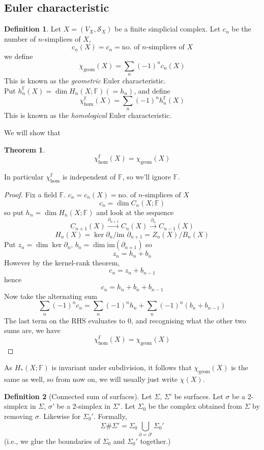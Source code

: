 \documentclass[a4paper,14pt]{extarticle}
\theoremstyle{definition}
\newtheorem*{theorem}{Theorem}
\newtheorem*{definition}{Definition}
\begin{document}
\subsection{{Euler characteristic}}
\begin{definition}
	Let $X=(V_X,\mathcal{S}_X)$ be a finite simplicial complex. Let $c_n$ be the number of
	$n$-simplices of $X$, \[c_n(X)=c_n=\text{no. of $n$-simplices of $X$}\] we define
	\[\chi_\text{geom}(X)=\sum_{n}(-1)^n c_n(X)\]
	This is known as the \emph{geometric} Euler characteristic. \\

	Put $h_n^\mathbb{F}(X) = \dim H_n(X;\mathbb{F}) (=h_n)$, and define
	\[\chi_\text{hom}^\mathbb{F}(X)=\sum_n (-1)^n h_n^\mathbb{F}(X)\]
	This is known as the \emph{homological} Euler characteristic.
\end{definition}

We will show that 
\begin{theorem}
	\[\chi_\text{hom}^\mathbb{F}(X)=\chi_\text{geom}(X)\]
\end{theorem}
In particular $\chi_\text{hom}^\mathbb{F}$ is independent of $\mathbb{F}$, so we'll ignore
$\mathbb{F}$.

\begin{proof}
	Fix a field $\mathbb{F}$. $c_n=c_n(X)=\text{no. of $n$-simplices of $X$}$
	\[c_n=\dim C_n(X;\mathbb{F})\] so put $h_n=\dim H_n(X;\mathbb{F})$ and look at the 
	sequence
	\[C_{n+1}(X)\xrightarrow{\partial_{n+1}}C_n(X)\xrightarrow{\partial_n}C_{n-1}(X)\]
	\[H_n(X)=\ker\partial_n/\text{im }\partial_{n+1}=Z_n(X)/B_n(X)\]
	Put $z_n=\dim\ker\partial_n, \,b_n=\dim\text{im}(\partial_{n+1})$ so 
	\[z_n=h_n+b_n\] However by the kernel-rank theorem,
	\[c_n=z_n+b_{n-1}\] hence \[c_n=h_n+b_n+b_{n-1}\]
	Now take the alternating sum 
	\[\sum_{n} (-1)^n c_n=\sum_n (-1)^n h_n +\sum_n (-1)^n (b_n+b_{n-1})\]
	The last term on the RHS evaluates to 0, and recognising what the other two sums are, we
	have \[\chi_\text{hom}^\mathbb{F}(X)=\chi_\text{geom}(X)\]
\end{proof}

As $H_*(X;\mathbb{F})$ is invariant under subdivision, it follows that $\chi_\text{geom}(X)$
is the same as well, so from now on, we will usually just write $\chi(X)$.

\begin{definition}[Connected sum of surfaces]
	Let $\Sigma, \,\Sigma'$ be surfaces. Let $\sigma$ be a $2$-simplex in $\Sigma, \,\sigma'$ 
	be a $2$-simplex in $\Sigma'$. Let $\Sigma_0$ be the complex obtained from $\Sigma$ by 
	removing $\sigma$. Likewise for $\Sigma_0'$. Formally,
	\[\Sigma\#\Sigma'=\Sigma_0\bigcup_{\partial=\partial'}\Sigma_0'\]
	(i.e., we glue the boundaries of $\Sigma_0$ and $\Sigma_0'$ together.)
\end{definition}
\end{document}
